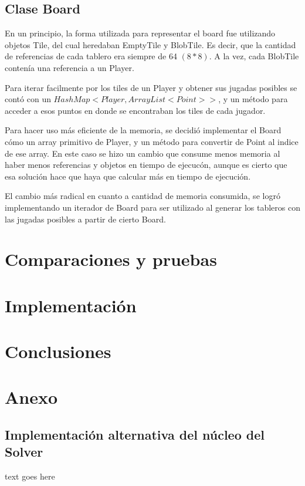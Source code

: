 \documentclass[10pt,a4paper,notitlepage,twocolumn,draft]{article}
\begin{document}
  \subsection{Clase Board}
    En un principio, la forma utilizada para representar el board fue utilizando objetos Tile, del cual heredaban EmptyTile y BlobTile.
    Es decir, que la cantidad de referencias de cada tablero era siempre de 64 $(8 * 8)$.  A la vez, cada BlobTile contenía una referencia a un Player.

    Para iterar facilmente por los tiles de un Player y obtener sus jugadas posibles se contó con un $HashMap<Player, ArrayList<Point>>$, y un método para acceder a esos  puntos en donde se encontraban los tiles de cada jugador.

    Para hacer uso más eficiente de la memoria, se decidió implementar el Board cómo un array primitivo de Player, y un método para convertir de Point al indice de ese array.
    En este caso se hizo un cambio que consume menos memoria al haber menos referencias y objetos en tiempo de ejecucón, aunque es cierto que esa solución hace que haya que calcular más en tiempo de ejecución.

    El cambio más radical en cuanto a cantidad de memoria consumida, se logró implementando un iterador de Board para ser utilizado al generar los tableros con
    las jugadas posibles a partir de cierto Board.

\section{Comparaciones y pruebas}
\section{Implementación}
\section{Conclusiones}
\section{Anexo}
\subsection{Implementación alternativa del núcleo del Solver}
\begin{thebibliography}{9}
   text goes here
\end{thebibliography}
\end{document}
